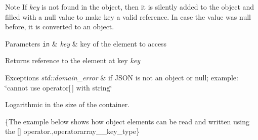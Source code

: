 \begin{DoxyNote}{Note}
If {\itshape key} is not found in the object, then it is silently added to the object and filled with a {\ttfamily null} value to make {\ttfamily key} a valid reference. In case the value was {\ttfamily null} before, it is converted to an object.
\end{DoxyNote}

\begin{DoxyParams}[1]{Parameters}
\mbox{\tt in}  & {\em key} & key of the element to access\\
\hline
\end{DoxyParams}
\begin{DoxyReturn}{Returns}
reference to the element at key {\itshape key} 
\end{DoxyReturn}

\begin{DoxyExceptions}{Exceptions}
{\em std\-::domain\-\_\-error} & if J\-S\-O\-N is not an object or null; example\-: {\ttfamily \char`\"{}cannot use operator\mbox{[}$\,$\mbox{]} with string\char`\"{}}\\
\hline
\end{DoxyExceptions}
Logarithmic in the size of the container.

\{The example below shows how object elements can be read and written using the {\ttfamily \mbox{[}\mbox{]}} operator.,operatorarray\-\_\-\-\_\-key\-\_\-type\}


